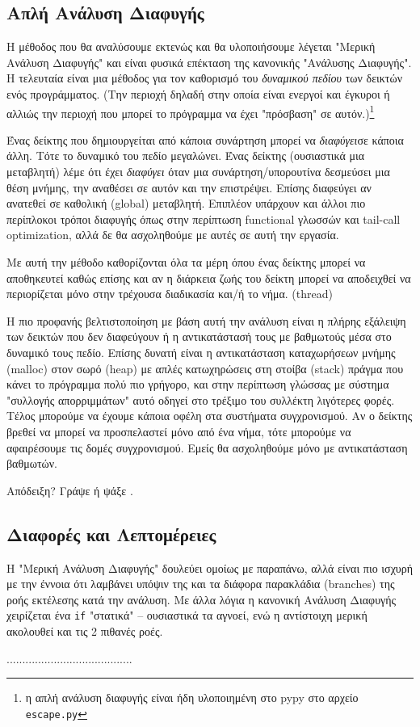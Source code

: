 \subsection{Απλή Ανάλυση Διαφυγής}

Η μέθοδος που θα αναλύσουμε εκτενώς και θα υλοποιήσουμε λέγεται "Μερική
Ανάλυση Διαφυγής" και είναι φυσικά επέκταση της κανονικής "Ανάλυσης Διαφυγής".
Η τελευταία είναι μια μέθοδος για τον καθορισμό του \textit{δυναμικού πεδίου}
των δεικτών ενός προγράμματος. (Την περιοχή δηλαδή στην οποία είναι ενεργοί
και έγκυροι ή αλλιώς την περιοχή που μπορεί το πρόγραμμα να έχει "πρόσβαση" σε
αυτόν.)\footnote{η απλή ανάλυση διαφυγής είναι ήδη υλοποιημένη στο pypy στο
αρχείο \texttt{escape.py}}

Ένας δείκτης που δημιουργείται από κάποια συνάρτηση μπορεί να
\textit{διαφύγει}σε κάποια άλλη. Τότε το δυναμικό του πεδίο μεγαλώνει. Ένας
δείκτης (ουσιαστικά μια μεταβλητή) λέμε ότι έχει \textit{διαφύγει} όταν μια
συνάρτηση/υπορουτίνα δεσμεύσει μια θέση μνήμης, την αναθέσει σε αυτόν και την
επιστρέψει. Επίσης διαφεύγει αν ανατεθεί σε καθολική (global) μεταβλητή.
Επιπλέον υπάρχουν και άλλοι πιο περίπλοκοι τρόποι διαφυγής όπως στην περίπτωση
functional γλωσσών και tail-call optimization, αλλά δε θα ασχοληθούμε με αυτές
σε αυτή την εργασία.

Με αυτή την μέθοδο καθορίζονται όλα τα μέρη όπου ένας δείκτης μπορεί να
αποθηκευτεί καθώς επίσης και αν η διάρκεια ζωής του δείκτη μπορεί να αποδειχθεί
να περιορίζεται μόνο στην τρέχουσα διαδικασία και/ή το νήμα. (thread)

Η πιο προφανής βελτιστοποίηση με βάση αυτή την ανάλυση είναι η πλήρης εξάλειψη
των δεικτών που δεν διαφεύγουν ή η αντικατάστασή τους με βαθμωτούς μέσα στο
δυναμικό τους πεδίο. Επίσης δυνατή είναι η αντικατάσταση καταχωρήσεων μνήμης
(malloc) στον σωρό (heap) με απλές κατωχηρώσεις στη στοίβα (stack) πράγμα που
κάνει το πρόγραμμα πολύ πιο γρήγορο, και στην περίπτωση γλώσσας με σύστημα
"συλλογής απορριμμάτων" αυτό οδηγεί στο τρέξιμο του συλλέκτη λιγότερες φορές.
Τέλος μπορούμε να έχουμε κάποια οφέλη στα συστήματα συγχρονισμού. Αν ο δείκτης
βρεθεί να μπορεί να προσπελαστεί μόνο από ένα νήμα, τότε μπορούμε να αφαιρέσουμε
τις δομές συγχρονισμού. Εμείς θα ασχοληθούμε μόνο με αντικατάσταση βαθμωτών.

Απόδειξη? Γράψε ή ψάξε\cite{proof} \cite{complexity}.

\subsection{Διαφορές και Λεπτομέρειες}

Η "Μερική Ανάλυση Διαφυγής" δουλεύει ομοίως με παραπάνω, αλλά είναι πιο ισχυρή
με την έννοια ότι λαμβάνει υπόψιν της και τα διάφορα παρακλάδια (branches) της
ροής εκτέλεσης κατά την ανάλυση. Με άλλα λόγια η κανονική Ανάλυση Διαφυγής
χειρίζεται ένα \texttt{if} "στατικά" – ουσιαστικά τα αγνοεί, ενώ η αντίστοιχη
μερική ακολουθεί και τις 2 πιθανές ροές.

........................................

